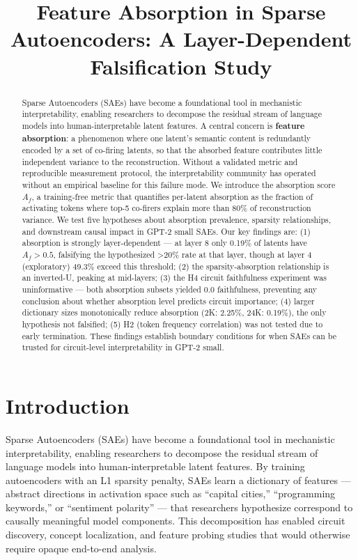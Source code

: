 \documentclass{article}
\title{Feature Absorption in Sparse Autoencoders: A Layer-Dependent Falsification Study}
\begin{document}
\maketitle

\begin{abstract}
Sparse Autoencoders (SAEs) have become a foundational tool in mechanistic interpretability, enabling researchers to decompose the residual stream of language models into human-interpretable latent features. A central concern is \textbf{feature absorption}: a phenomenon where one latent's semantic content is redundantly encoded by a set of co-firing latents, so that the absorbed feature contributes little independent variance to the reconstruction. Without a validated metric and reproducible measurement protocol, the interpretability community has operated without an empirical baseline for this failure mode. We introduce the absorption score $A_f$, a training-free metric that quantifies per-latent absorption as the fraction of activating tokens where top-5 co-firers explain more than 80\% of reconstruction variance. We test five hypotheses about absorption prevalence, sparsity relationships, and downstream causal impact in GPT-2 small SAEs. Our key findings are: (1) absorption is strongly layer-dependent --- at layer 8 only 0.19\% of latents have $A_f > 0.5$, falsifying the hypothesized >20\% rate at that layer, though at layer 4 (exploratory) 49.3\% exceed this threshold; (2) the sparsity-absorption relationship is an inverted-U, peaking at mid-layers; (3) the H4 circuit faithfulness experiment was uninformative --- both absorption subsets yielded 0.0 faithfulness, preventing any conclusion about whether absorption level predicts circuit importance; (4) larger dictionary sizes monotonically reduce absorption (2K: 2.25\%, 24K: 0.19\%), the only hypothesis not falsified; (5) H2 (token frequency correlation) was not tested due to early termination. These findings establish boundary conditions for when SAEs can be trusted for circuit-level interpretability in GPT-2 small.
\end{abstract}

\section{Introduction}

Sparse Autoencoders (SAEs) have become a foundational tool in mechanistic interpretability, enabling researchers to decompose the residual stream of language models into human-interpretable latent features. By training autoencoders with an L1 sparsity penalty, SAEs learn a dictionary of features --- abstract directions in activation space such as ``capital cities,'' ``programming keywords,'' or ``sentiment polarity'' --- that researchers hypothesize correspond to causally meaningful model components. This decomposition has enabled circuit discovery, concept localization, and feature probing studies that would otherwise require opaque end-to-end analysis.
\end{document}

